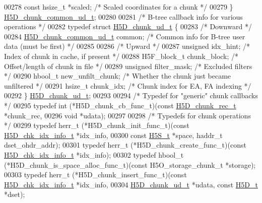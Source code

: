 \begin{DoxyCode}
00278     \textcolor{keyword}{const} hsize\_t *scaled;              \textcolor{comment}{/* Scaled coordinates for a chunk */}
00279 \} \hyperlink{struct_h5_d__chunk__common__ud__t}{H5D\_chunk\_common\_ud\_t};
00280 
00281 \textcolor{comment}{/* B-tree callback info for various operations */}
00282 \textcolor{keyword}{typedef} \textcolor{keyword}{struct }\hyperlink{struct_h5_d__chunk__ud__t}{H5D\_chunk\_ud\_t} \{
00283     \textcolor{comment}{/* Downward */}
00284     \hyperlink{struct_h5_d__chunk__common__ud__t}{H5D\_chunk\_common\_ud\_t} common;       \textcolor{comment}{/* Common info for B-tree user data (must be
       first) */}
00285 
00286     \textcolor{comment}{/* Upward */}
00287     \textcolor{keywordtype}{unsigned}    idx\_hint;               \textcolor{comment}{/* Index of chunk in cache, if present */}
00288     H5F\_block\_t chunk\_block;            \textcolor{comment}{/* Offset/length of chunk in file */}
00289     \textcolor{keywordtype}{unsigned}    filter\_mask;        \textcolor{comment}{/* Excluded filters */}
00290     hbool\_t     new\_unfilt\_chunk;       \textcolor{comment}{/* Whether the chunk just became unfiltered */}
00291     hsize\_t     chunk\_idx;              \textcolor{comment}{/* Chunk index for EA, FA indexing */}
00292 \} \hyperlink{struct_h5_d__chunk__ud__t}{H5D\_chunk\_ud\_t};
00293 
00294 \textcolor{comment}{/* Typedef for "generic" chunk callbacks */}
00295 \textcolor{keyword}{typedef} int (*H5D\_chunk\_cb\_func\_t)(\textcolor{keyword}{const} \hyperlink{struct_h5_d__chunk__rec__t}{H5D\_chunk\_rec\_t} *chunk\_rec,
00296     \textcolor{keywordtype}{void} *udata);
00297 
00298 \textcolor{comment}{/* Typedefs for chunk operations */}
00299 \textcolor{keyword}{typedef} herr\_t (*H5D\_chunk\_init\_func\_t)(\textcolor{keyword}{const} \hyperlink{struct_h5_d__chk__idx__info__t}{H5D\_chk\_idx\_info\_t} *idx\_info,
00300     \textcolor{keyword}{const} \hyperlink{struct_h5_s__t}{H5S\_t} *space, haddr\_t dset\_ohdr\_addr);
00301 \textcolor{keyword}{typedef} herr\_t (*H5D\_chunk\_create\_func\_t)(\textcolor{keyword}{const} \hyperlink{struct_h5_d__chk__idx__info__t}{H5D\_chk\_idx\_info\_t} *idx\_info);
00302 \textcolor{keyword}{typedef} hbool\_t (*H5D\_chunk\_is\_space\_alloc\_func\_t)(\textcolor{keyword}{const} H5O\_storage\_chunk\_t *storage);
00303 \textcolor{keyword}{typedef} herr\_t (*H5D\_chunk\_insert\_func\_t)(\textcolor{keyword}{const} \hyperlink{struct_h5_d__chk__idx__info__t}{H5D\_chk\_idx\_info\_t} *idx\_info,
00304     \hyperlink{struct_h5_d__chunk__ud__t}{H5D\_chunk\_ud\_t} *udata, \textcolor{keyword}{const} \hyperlink{struct_h5_d__t}{H5D\_t} *dset);

\end{DoxyCode}
